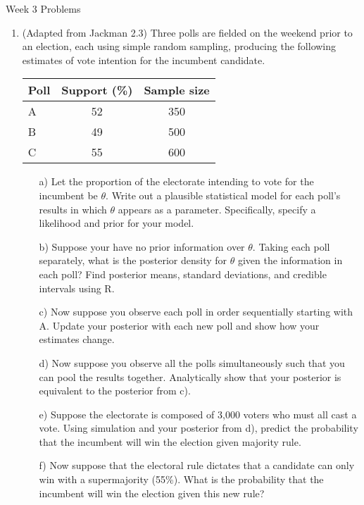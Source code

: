 \documentclass[10pt,a4paper]{article}
\author{Patrick Lam}
\begin{document}
\begin{center}
\begin{Large}Week 3 Problems\end{Large}
\end{center}
\bigskip
\begin{enumerate}

\item (Adapted from Jackman 2.3) Three polls are fielded on the weekend prior to an election, each using simple random sampling, producing the following estimates of vote intention for the incumbent candidate.
\medskip

\begin{center}
\begin{tabular}{lcc}
\hline
Poll & Support (\%) & Sample size \\
\hline
A & 52 & 350 \\
B & 49 & 500 \\
C & 55 & 600 \\
\hline
\end{tabular}
\end{center}
\medskip
\begin{itemize}
\item[a)] Let the proportion of the electorate intending to vote for the incumbent be $\theta$.  Write out a plausible statistical model for each poll's results in which $\theta$ appears as a parameter.  Specifically, specify a likelihood and prior for your model. \\
\item[b)] Suppose your have no prior information over $\theta$.  Taking each poll separately, what is the posterior density for $\theta$ given the information in each poll?  Find posterior means, standard deviations, and credible intervals using R. \\
\item[c)] Now suppose you observe each poll in order sequentially starting with A.  Update your posterior with each new poll and show how your estimates change. \\
\item[d)] Now suppose you observe all the polls simultaneously such that you can pool the results together.  Analytically show that your posterior is equivalent to the posterior from c).\\
\item[e)] Suppose the electorate is composed of 3,000 voters who must all cast a vote.  Using simulation and your posterior from d), predict the probability that the incumbent will win the election given majority rule. \\
\item[f)] Now suppose that the electoral rule dictates that a candidate can only win with a supermajority (55\%).  What is the probability that the incumbent will win the election given this new rule?
\end{itemize}



\end{enumerate}
\end{document}
